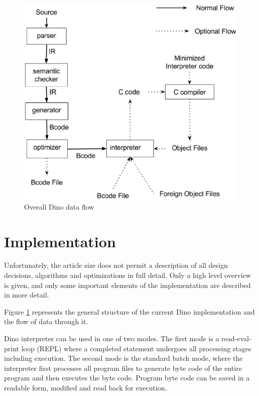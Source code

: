 \documentclass[preprint]{sigplanconf}
\begin{document}
\begin{center}
\begin{figure}[ht]
\begin{center}
\includegraphics[scale=0.5]{Dino_Flow.eps}
\end{center}
\caption{Overall Dino data flow}
\label{fig:Dino-flow}
\end{figure}
\end{center}

\section{Implementation}
  Unfortunately, the article size does not permit a description
of all design decisions, algorithms and optimizations in full detail.
Only a high level overview is given, and only some important elements
of the implementation are described in more detail.
  
  Figure \ref{fig:Dino-flow} represents the general structure of the current Dino
implementation and the flow of data through it.

  Dino interpreter can be used in one of two modes.  The first mode is a read-eval-print 
loop (REPL) where a completed statement undergoes all
processing stages including execution. %
The second mode is the standard batch mode, where the interpreter
first processes all program files to generate byte code of the entire
program and then executes the byte code.  Program byte code can
be saved in a readable form, modified and read back for execution.
\end{document}
